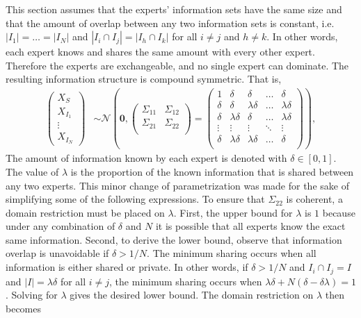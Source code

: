 \documentclass[11pt,twoside]{article}
\theoremstyle{definition}
\theoremstyle{definition}
\begin{document}
This section assumes that the experts' information sets have the same size and that the amount of overlap between any two information sets is constant, i.e.  $|I_{1}| =  \dots = |I_{N}|$ and $|I_{i} \cap I_{j}| = |I_{h} \cap I_{k}|$ for all $i \neq j$ and $h \neq k$. In other words, each expert knows and shares the same amount with every other expert. Therefore the experts are exchangeable, and no single expert can dominate. The resulting information structure is compound symmetric. That is,
\begin{align*}
\left(\begin{matrix} X_{S} \\ X_{I_1}\\ \vdots \\ X_{I_N} \end{matrix}\right) &\sim \mathcal{N}\left( 
 \boldsymbol{0}, \left(\begin{matrix} 
\Sigma_{11} & \Sigma_{12}\\
\Sigma_{21} & \Sigma_{22}\\
 \end{matrix}\right) 
 =
 \left(\begin{array}{c|cccc}
1 & \delta & \delta & \dots & \delta  \\ \hline
\delta & \delta &\lambda\delta & \dots & \lambda\delta   \\ 
\delta & \lambda\delta & \delta & \dots & \lambda\delta  \\ 
\vdots & \vdots & \vdots & \ddots & \vdots  \\ 
\delta & \lambda\delta & \lambda\delta & \dots & \delta\\ 
 \end{array}\right)\right),
\end{align*}
The amount of information known by each expert is denoted with $\delta \in [0,1]$. The value of $\lambda$ is the proportion of the known information that is shared between any two experts.  This minor change of parametrization was made for the sake of simplifying some of the following expressions. To ensure that $\Sigma_{22}$ is coherent, a domain restriction must be placed on $\lambda$. First, the upper bound for $\lambda$ is $1$ because under any combination of $\delta$ and $N$ it is possible that all experts know the exact same information. Second, to derive the lower bound, observe that information overlap is unavoidable if $\delta > 1/N$. The minimum sharing occurs when all information is either shared or private. In other words, if $\delta > 1/N$ and $I_{i} \cap I_j = I$ and $|I| =  \lambda \delta$ for all $i \neq j$, the minimum sharing occurs when $\lambda\delta + N(\delta - \delta\lambda) = 1$. Solving for $\lambda$ gives the desired lower bound. The domain restriction on $\lambda$ then becomes
\end{document}
